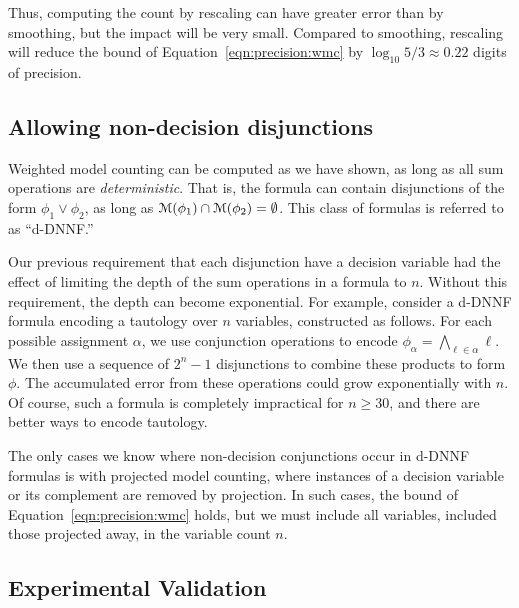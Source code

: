 \documentclass[letterpaper,USenglish,cleveref, autoref, thm-restate]{lipics-v2021}
\newcommand{\lit}{\ell}
\newcommand{\assign}{\alpha}
\newcommand{\modelset}{{\cal M}}
\begin{document}
Thus, computing the count by rescaling can have greater error than by smoothing, but the impact will be very small.
Compared to smoothing, rescaling will reduce the bound of Equation~\ref{eqn:precision:wmc} by $\log_{10} 5/3 \approx 0.22$ digits of precision.

\subsection{Allowing non-decision disjunctions}

Weighted model counting can be computed as we have shown, as long as
all sum operations are \emph{deterministic}.  That is, the formula can
contain disjunctions of the form $\phi_1 \lor \phi_2$, as long as
$\modelset(\phi_1) \cap \modelset(\phi_2) = \emptyset$.  This class of formulas is referred to as ``d-DNNF.''

Our previous requirement that each disjunction have a decision variable
had the effect of limiting the depth of the sum operations in a
formula to $n$.  Without this requirement, the depth can become exponential.
For example, consider a d-DNNF formula encoding a tautology over $n$
variables, constructed as follows.  For each possible assignment
$\assign$, we use conjunction operations to encode 
$\phi_{\assign} = \bigwedge_{\lit \in \assign} \lit$.  We then use a sequence of $2^n-1$ disjunctions to combine these products to form $\phi$.
The accumulated error from these operations could grow exponentially with $n$.
Of course, such a formula is completely impractical for $n \geq 30$, and there are better ways to encode tautology.

The only
cases we know where non-decision conjunctions occur in d-DNNF formulas is with projected model counting, where
instances of a decision variable or its complement are removed by projection.
In such cases, the bound of Equation~\ref{eqn:precision:wmc} holds,
but we must include all variables, included those projected away, in the
variable count $n$.

\subsection{Experimental Validation}
\end{document}
